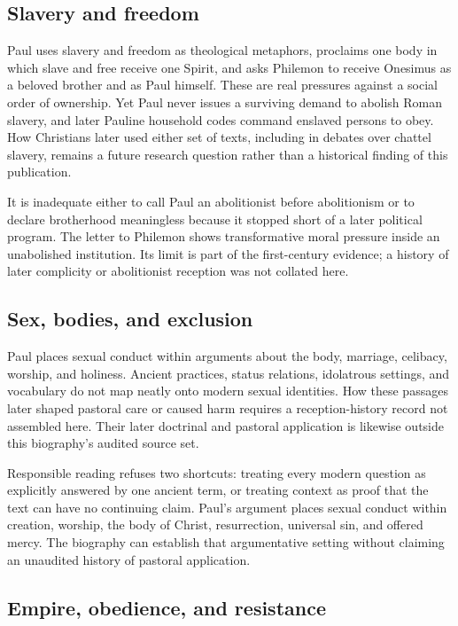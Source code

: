 \subsection{Slavery and freedom}

Paul uses slavery and freedom as theological metaphors, proclaims one body in
which slave and free receive one Spirit, and asks Philemon to receive Onesimus
as a beloved brother and as Paul himself. These are real pressures against a
social order of ownership. Yet Paul never issues a surviving demand to abolish
Roman slavery, and later Pauline household codes command enslaved persons to
obey. How Christians later used either set of texts, including in debates over
chattel slavery, remains a future research question rather than a historical
finding of this publication.

It is inadequate either to call Paul an abolitionist before abolitionism or to
declare brotherhood meaningless because it stopped short of a later political
program. The letter to Philemon shows transformative moral pressure inside an
unabolished institution. Its limit is part of the first-century evidence; a
history of later complicity or abolitionist reception was not collated here.

\subsection{Sex, bodies, and exclusion}

Paul places sexual conduct within arguments about the body, marriage,
celibacy, worship, and holiness. Ancient practices, status relations,
idolatrous settings, and vocabulary do not map neatly onto modern sexual
identities. How these passages later shaped pastoral care or caused harm
requires a reception-history record not assembled here. Their later doctrinal
and pastoral application is likewise outside this biography's audited source
set.

Responsible reading refuses two shortcuts: treating every modern question as
explicitly answered by one ancient term, or treating context as proof that the
text can have no continuing claim. Paul's argument places sexual conduct
within creation, worship, the body of Christ, resurrection, universal sin, and
offered mercy. The biography can establish that argumentative setting without
claiming an unaudited history of pastoral application.

\subsection{Empire, obedience, and resistance}

